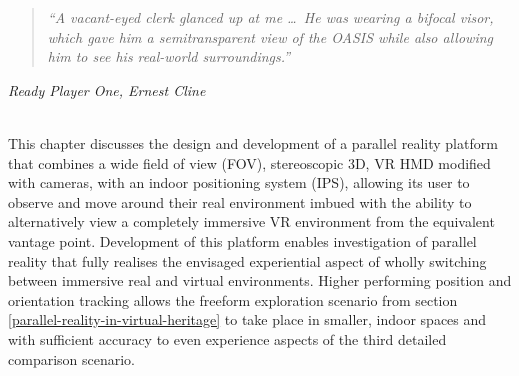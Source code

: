 \begin{quote}
	\textit{``A vacant-eyed clerk glanced up at me \ldots\ He was wearing a bifocal visor, which gave him a semitransparent view of the OASIS while also allowing him to see his real-world surroundings.''}%
\end{quote}
\hfill \textit{Ready Player One, Ernest Cline}
\\
\\


\label{chapter-mirrorshades}

This chapter discusses the design and development of a parallel reality platform that combines a wide field of view (FOV), stereoscopic 3D, VR HMD modified with cameras, with an indoor positioning system (IPS), allowing its user to observe and move around their real environment imbued with the ability to alternatively view a completely immersive VR environment from the equivalent vantage point. Development of this platform enables investigation of parallel reality that fully realises the envisaged experiential aspect of wholly switching between immersive real and virtual environments. Higher performing position and orientation tracking allows the freeform exploration scenario from section \ref{parallel-reality-in-virtual-heritage} to take place in smaller, indoor spaces and with sufficient accuracy to even experience aspects of the third detailed comparison scenario.



